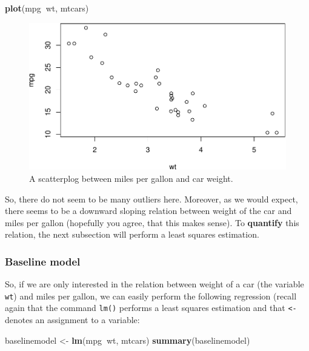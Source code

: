 \documentclass[]{article}
\newenvironment{Shaded}{\begin{snugshade}}{\end{snugshade}}
\newcommand{\KeywordTok}[1]{\textcolor[rgb]{0.13,0.29,0.53}{\textbf{#1}}}
\newcommand{\StringTok}[1]{\textcolor[rgb]{0.31,0.60,0.02}{#1}}
\newcommand{\OperatorTok}[1]{\textcolor[rgb]{0.81,0.36,0.00}{\textbf{#1}}}
\newcommand{\NormalTok}[1]{#1}
\theoremstyle{definition}
\theoremstyle{definition}
\theoremstyle{definition}
\theoremstyle{remark}
\begin{document}
\begin{Shaded}
\begin{Highlighting}[]
\KeywordTok{plot}\NormalTok{(mpg}\OperatorTok{~}\NormalTok{wt, mtcars)}
\end{Highlighting}
\end{Shaded}

\begin{figure}
\centering
\includegraphics{./unnamed-chunk-34-1.pdf}
\caption{\label{fig:unnamed-chunk-34}A scatterplog between miles per gallon
and car weight.}
\end{figure}

So, there do not seem to be many outliers here. Moreover, as we would
expect, there seems to be a downward sloping relation between weight of
the car and miles per gallon (hopefully you agree, that this makes
sense). To \textbf{quantify} this relation, the next subsection will
perform a least squares estimation.

\subsubsection{Baseline model}\label{baseline-model}

So, if we are only interested in the relation between weight of a car
(the variable \texttt{wt}) and miles per gallon, we can easily perform
the following regression (recall again that the command \texttt{lm()}
performs a least squares estimation and that \texttt{\textless{}-}
denotes an assignment to a variable:

\begin{Shaded}
\begin{Highlighting}[]
\NormalTok{baselinemodel <-}\StringTok{ }\KeywordTok{lm}\NormalTok{(mpg}\OperatorTok{~}\NormalTok{wt, mtcars)}
\KeywordTok{summary}\NormalTok{(baselinemodel)}
\end{Highlighting}
\end{Shaded}
\end{document}
